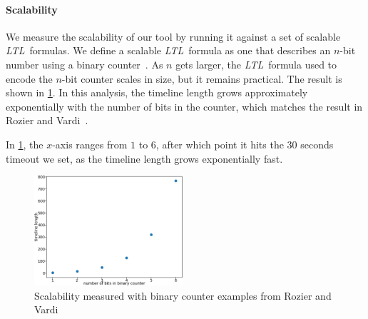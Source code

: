 \documentclass[conference]{IEEEtran}
\theoremstyle{definition}
\theoremstyle{remark}
\newcommand{\ltl}{\textit{LTL}}
\begin{document}
\paragraph{Scalability}
We measure the scalability of our tool by running it against a set of scalable \ltl\ formulas. We define a scalable \ltl\ formula as one that describes an $n$-bit number using a binary counter~\cite{RV10}. As $n$ gets larger, the \ltl\ formula used to encode the $n$-bit counter scales in size, but it remains practical. The result is shown in \cref{fig:scalability}. In this analysis, the timeline length grows approximately exponentially with the number of bits in the counter, which matches the result in Rozier and Vardi~\cite{RV10}.

In \cref{fig:scalability}, the $x$-axis ranges from $1$ to $6$, after which point it hits the $30$ seconds timeout we set, as the timeline length grows exponentially fast.

\begin{figure}[h!]
    \centering
    \includegraphics[width=0.49\textwidth]{img/binary.png}
    \caption{Scalability measured with binary counter examples from Rozier and Vardi~\cite{RV10}}
    \label{fig:scalability}
\end{figure}

\end{document}
